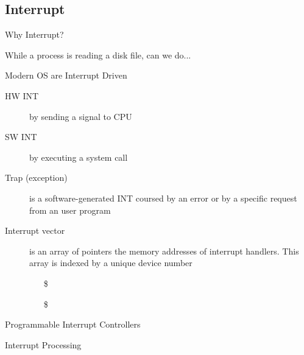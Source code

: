 \subsection{Interrupt}
\label{sec:interrupt}

\begin{frame}{Why Interrupt?}
  \begin{block}{While a process is reading a disk file, can we do...}
    \begin{center}
    \end{center}
  \end{block}
\end{frame}

\begin{frame}{Modern OS are Interrupt Driven}
  \begin{description}
  \item[HW INT] by sending a signal to CPU
  \item[SW INT] by executing a \alert{system call}
  \item[Trap (exception)] is a software-generated INT coursed by an error or by a
    specific request from an user program
  \item[Interrupt vector] is an array of pointers {\pright} the memory addresses
    of \alert{interrupt handlers}. This array is indexed by a unique device number
    \begin{itemize}
    \item[\$] 
    \item[\$] 
    \end{itemize}
  \end{description}
\end{frame}

\begin{frame}{Programmable Interrupt Controllers}
  \begin{center}
  \end{center}
\end{frame}

\begin{frame}{Interrupt Processing}
  \begin{center}
  \end{center}
\end{frame}

